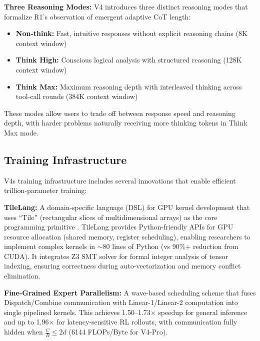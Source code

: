 \documentclass[11pt,a4paper]{article}
\begin{document}
\textbf{Three Reasoning Modes:} V4 introduces three distinct reasoning modes that formalize R1's observation of emergent adaptive CoT length:
\begin{itemize}
    \item \textbf{Non-think:} Fast, intuitive responses without explicit reasoning chains (8K context window)
    \item \textbf{Think High:} Conscious logical analysis with structured reasoning (128K context window)
    \item \textbf{Think Max:} Maximum reasoning depth with interleaved thinking across tool-call rounds (384K context window)
\end{itemize}

These modes allow users to trade off between response speed and reasoning depth, with harder problems naturally receiving more thinking tokens in Think Max mode.

\subsection{Training Infrastructure}
\label{sec:infrastructure}

V4{\textquotesingle}s training infrastructure includes several innovations that enable efficient trillion-parameter training:

\textbf{TileLang:} A domain-specific language (DSL) for GPU kernel development that uses {\textquotedblleft}Tile{\textquotedblright} (rectangular slices of multidimensional arrays) as the core programming primitive \cite{tilelang}. TileLang provides Python-friendly APIs for GPU resource allocation (shared memory, register scheduling), enabling researchers to implement complex kernels in $\sim$80 lines of Python (vs 90\%+ reduction from CUDA). It integrates Z3 SMT solver for formal integer analysis of tensor indexing, ensuring correctness during auto-vectorization and memory conflict elimination.

\textbf{Fine-Grained Expert Parallelism:} A wave-based scheduling scheme that fuses Dispatch/Combine communication with Linear-1/Linear-2 computation into single pipelined kernels. This achieves 1.50--1.73$\times$ speedup for general inference and up to 1.96$\times$ for latency-sensitive RL rollouts, with communication fully hidden when $\frac{C}{B} \leq 2d$ (6144 FLOPs/Byte for V4-Pro).
\end{document}
